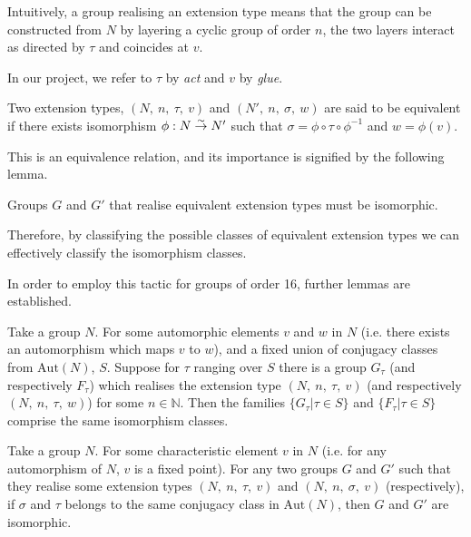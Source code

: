 \documentclass[a4paper,11pt, titlepage]{article}
\theoremstyle{remark}
\newcommand{\isom}{\stackrel{\sim}{\smash{\rightarrow}\rule{0pt}{0.8ex}}}
\begin{document}
Intuitively, a group realising an extension type means that the group can be constructed from $N$ by layering a cyclic group of order $n$, the two layers interact as directed by $\tau$ and coincides at $v$.

In our project, we refer to $\tau$ by \textit{act} and $v$ by \textit{glue}.

\begin{definition}[Wild]
    Two extension types, $(N,\ n,\ \tau,\ v)$ and $(N',\ n,\ \sigma,\ w)$ are said to be equivalent if there exists isomorphism $\phi : N \isom N'$ such that $\sigma = \phi \circ \tau \circ \phi^{-1}$ and $w = \phi(v)$.
\end{definition}

This is an equivalence relation, and its importance is signified by the following lemma.

\begin{lemma}[Wild]
    Groups $G$ and $G'$ that realise equivalent extension types must be isomorphic.
\end{lemma}

Therefore, by classifying the possible classes of equivalent extension types we can effectively classify the isomorphism classes.

In order to employ this tactic for groups of order 16, further lemmas are established.

\begin{lemma}[Wild]
    Take a group $N$.
    For some automorphic elements $v$ and $w$ in $N$ (i.e. there exists an automorphism which maps $v$ to $w$), and a fixed union of conjugacy classes from $\text{Aut}(N)$, $S$.
    Suppose for $\tau$ ranging over $S$ there is a group $G_\tau$ (and respectively $F_\tau$) which realises the extension type $(N,\ n,\ \tau,\ v)$ (and respectively $(N,\ n,\ \tau,\ w)$) for some $n \in \mathbb{N}$.
    Then the families $\{G_\tau | \tau \in S\}$ and $\{F_\tau | \tau \in S\}$ comprise the same isomorphism classes.
\end{lemma}

\begin{lemma}[Wild]
    Take a group $N$.
    For some characteristic element $v$ in $N$ (i.e. for any automorphism of $N$, $v$ is a fixed point).
    For any two groups $G$ and $G'$ such that they realise some extension types $(N,\ n,\ \tau,\ v)$ and $(N,\ n,\ \sigma,\ v)$ (respectively), if $\sigma$ and $\tau$ belongs to the same conjugacy class in $\text{Aut}(N)$, then $G$ and $G'$ are isomorphic.
\end{lemma}
\end{document}
